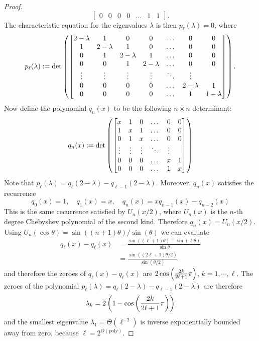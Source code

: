 \documentclass[english]{article}
\numberwithin{equation}{section}
\numberwithin{figure}{section}
\theoremstyle{plain}
\theoremstyle{definition}
\theoremstyle{plain}
\theoremstyle{definition}
\theoremstyle{remark}
\theoremstyle{remark}
\theoremstyle{plain}
\begin{document}
\begin{proof}
\begin{equation}
\begin{bmatrix}
    0 & 0 & 0 & 0 & \dots  & 1 & 1
\end{bmatrix}.
\end{equation}
The characteristic equation for the eigenvalues $\lambda$ is then $p_\ell(\lambda) = 0$, where
\begin{equation} \label{eq:char_p}
p_\ell(\lambda) := 
\det \left(
\begin{bmatrix}
    2 - \lambda & 1 & 0 & 0 & \dots  & 0 & 0  \\
    1 & 2 - \lambda & 1 & 0 &\dots  & 0 & 0 \\
    0 & 1 & 2 - \lambda & 1 & \dots  & 0 & 0 \\
     0 & 0 & 1 & 2 - \lambda & \dots  & 0 & 0 \\
    \vdots & \vdots & \vdots & \vdots & \ddots & \vdots \\
    0 & 0 & 0 & 0 & \dots  & 2 - \lambda & 1 \\
    0 & 0 & 0 & 0 & \dots  & 1 & 1 - \lambda \\
\end{bmatrix} \right).
\end{equation}
Now define the polynomial $q_n(x)$ to be the following $n \times n$ determinant:
\begin{equation}
q_n(x) := 
\det \left(
\begin{bmatrix}
    x & 1 & 0 & \dots  & 0 & 0  \\
    1 & x & 1 &\dots  & 0 & 0 \\
    0 & 1 & x  & \dots  & 0 & 0 \\
    \vdots & \vdots & \vdots & \ddots & \vdots \\
    0 & 0 & 0 & \dots  & x & 1 \\
    0 & 0 & 0 & \dots  & 1 & x \\
\end{bmatrix} \right)
\end{equation}
Note that $p_\ell(\lambda) = q_\ell(2-\lambda) - q_{\ell-1}(2-\lambda)$. Moreover, $q_n(x)$ satisfies the recurrence
\begin{equation}
q_0(x) = 1, \quad q_1(x) = x, \quad q_n(x) = x q_{n-1}(x) - q_{n-2} (x)
\end{equation}
This is the same recurrence satisfied by $U_n(x/2)$, where $U_n(x)$ is the $n$-th degree Chebyshev polynomial of the second kind. Therefore $q_n(x) = U_n(x/2)$. Using $U_n(\cos\theta) = \sin((n+1)\theta)/\sin(\theta)$ we can evaluate
\begin{align}
q_\ell(x) - q_{\ell}(x) &= \frac{\sin((\ell+1)\theta) - \sin(\ell \theta)}{\sin\theta} \\
&= \frac{\sin((2\ell+1)\theta/2)}{\sin (\theta/2)}
\end{align}
and therefore the zeroes of $q_\ell(x) - q_{\ell}(x)$ are $2\cos\left(\frac{2k}{2\ell + 1}\pi\right)$, $k = 1,\cdots,\ell$. The zeroes of the polynomial $p_\ell(\lambda) = q_\ell(2-\lambda) - q_{\ell-1}(2-\lambda)$ are therefore 
\begin{equation}
\lambda_k = 2\left(1 - \cos\left(\frac{2k}{2\ell+1}\pi\right)\right)
\end{equation}
and the smallest eigenvalue $\lambda_1 = \Theta(\ell^{-2})$ is inverse exponentially bounded away from zero, because $\ell = 2^{O(\text{poly})}$.


\end{proof}
\end{document}
